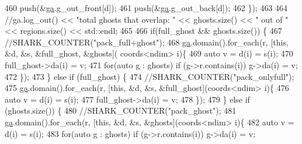 \begin{DoxyCode}
{460                                         push(&\hyperlink{classshark_1_1ndim_1_1_g_a_dest_aa64cb1bd1f2155c6cca997e4ba69760e}{ga}.g\_out\_front[d]);
461                                         push(&\hyperlink{classshark_1_1ndim_1_1_g_a_dest_aa64cb1bd1f2155c6cca997e4ba69760e}{ga}.g\_out\_back[d]);
462                                         \});
463 
464                                 \textcolor{comment}{//ga.log\_out() << "total ghosts that overlap: " << ghosts.size() << " out
       of " <<  regions.size() << std::endl;}
465 
466                                 \textcolor{keywordflow}{if}(full\_ghost && ghosts.size()) \{
467                                     \textcolor{comment}{//SHARK\_COUNTER("pack\_full+ghost");}
468                                     \hyperlink{classshark_1_1ndim_1_1_g_a_dest_aa64cb1bd1f2155c6cca997e4ba69760e}{ga}.domain().for\_each(r, [\textcolor{keyword}{this}, &d, &s, &full\_ghost, &ghosts](
      coords<ndim> i)\{
469                                             \textcolor{keyword}{auto} v = d(i) = s(i);
470                                             full\_ghost->da(i) = v;
471                                             \textcolor{keywordflow}{for}(\textcolor{keyword}{auto} g : ghosts) \textcolor{keywordflow}{if} (g->r.contains(i)) g->da(i) = v;
472                                     \});
473                                 \} \textcolor{keywordflow}{else} \textcolor{keywordflow}{if} (full\_ghost) \{
474                                     \textcolor{comment}{//SHARK\_COUNTER("pack\_onlyfull");}
475                                     \hyperlink{classshark_1_1ndim_1_1_g_a_dest_aa64cb1bd1f2155c6cca997e4ba69760e}{ga}.domain().for\_each(r, [\textcolor{keyword}{this}, &d, &s, &full\_ghost](coords<ndim> i)\{
476                                             \textcolor{keyword}{auto} v = d(i) = s(i);
477                                             full\_ghost->da(i) = v;
478                                     \});
479                                 \} \textcolor{keywordflow}{else} \textcolor{keywordflow}{if} (ghosts.size()) \{
480                                     \textcolor{comment}{//SHARK\_COUNTER("pack\_ghost");}
481                                     \hyperlink{classshark_1_1ndim_1_1_g_a_dest_aa64cb1bd1f2155c6cca997e4ba69760e}{ga}.domain().for\_each(r, [\textcolor{keyword}{this}, &d, &s, &ghosts](coords<ndim> i)\{
482                                             \textcolor{keyword}{auto} v = d(i) = s(i);
483                                             \textcolor{keywordflow}{for}(\textcolor{keyword}{auto} g : ghosts) \textcolor{keywordflow}{if} (g->r.contains(i)) g->da(i) = v;
}
\end{DoxyCode}
